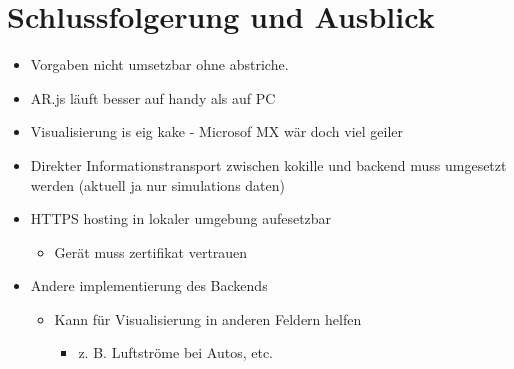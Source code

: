 \section{Schlussfolgerung und Ausblick}

\begin{itemize}
	\item Vorgaben nicht umsetzbar ohne abstriche.
	\item AR.js läuft besser auf handy als auf PC
	\item Visualisierung is eig kake - Microsof MX wär doch viel geiler
	\item Direkter Informationstransport zwischen kokille und backend muss umgesetzt werden (aktuell ja nur simulations daten)
	\item HTTPS hosting in lokaler umgebung aufesetzbar
	\begin{itemize} \renewcommand{\labelitemii}{$\Rightarrow$}
		\item Gerät muss zertifikat vertrauen
	\end{itemize}
	
	\item Andere implementierung des Backends
	\begin{itemize}
		\item Kann für Visualisierung in anderen Feldern helfen
		\begin{itemize}
			\item z. B. Luftströme bei Autos, etc.
		\end{itemize}
	\end{itemize}
\end{itemize}
